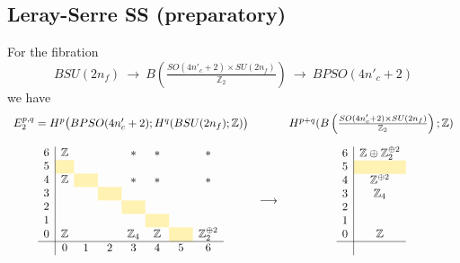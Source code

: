 \documentclass[12pt]{article}
\numberwithin{equation}{section}
\def\bZ{\mathbb{Z}}
\begin{document}
\subsection{Leray-Serre SS (preparatory)}
For the fibration
\begin{equation}
	BSU(2n_f)
	\ \to\ 
	B\left(\tfrac{SO(4n'_c+2)\times SU(2n_f)}{\bZ_2}\right)
	\ \to\ 
	BPSO(4n'_c+2)
\end{equation}
we have
\begin{equation}
	\begin{array}{ccc}
		E_2^{p,q}=H^p\big(BPSO(4n'_c+2);H^q(BSU(2n_f);\bZ)\big) && H^{p+q}(B\left(\tfrac{SO(4n'_c+2)\times SU(2n_f)}{\bZ_2}\right);\bZ)\vspace{4mm}\\
		\begin{array}{c|ccccccccccccc}
			6  & \bZ &&& \ast & \ast && \ast\\
			5  & \cellcolor{lightyellow} & \hphantom{\bZ_2} & \hphantom{\bZ_2} & \hphantom{\bZ_2} & \hphantom{\bZ_2} & \hphantom{\bZ_2} \\
			4  & \bZ & \cellcolor{lightyellow} && \ast & \ast & & \ast\\
			3  &  && \cellcolor{lightyellow} &&&\\
			2  &&  && \cellcolor{lightyellow} &&\\
			1  &  &&  && \cellcolor{lightyellow} &&\\
			0 & \bZ &  && \bZ_4 & \bZ & \cellcolor{lightyellow} & \bZ_2^{\oplus 2}\\
			\hline
			& 0 & 1 & 2 & 3 & 4 & 5 & 6 \\
		\end{array}
		& \longrightarrow & 
		\begin{array}{c|c}
			6  & \bZ\oplus \bZ_2^{\oplus 2}\\
			5  & \cellcolor{lightyellow}\\
			4  & \bZ^{\oplus 2}\\
			3  & \bZ_4\\
			2  & \\
			1  & \\
			0 & \bZ\\
			\hline\\
		\end{array}
	\end{array}
\end{equation}
\end{document}
